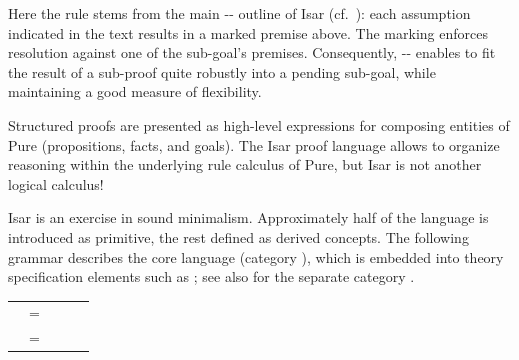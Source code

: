 \begin{isabellebody}
\begin{isamarkuptext}
  \noindent Here the  rule stems from the
  main \hyperlink{command.fix}{\mbox{}}-\hyperlink{command.assume}{\mbox{}}-\hyperlink{command.show}{\mbox{}} outline of
  Isar (cf.\ ): each assumption
  indicated in the text results in a marked premise  above.
  The marking enforces resolution against one of the sub-goal's
  premises.  Consequently, \hyperlink{command.fix}{\mbox{}}-\hyperlink{command.assume}{\mbox{}}-\hyperlink{command.show}{\mbox{}} enables to fit the result of a sub-proof quite robustly into a
  pending sub-goal, while maintaining a good measure of flexibility.%
\end{isamarkuptext}%
\isamarkuptrue%
%
\isamarkuptrue%
%
\begin{isamarkuptext}%
Structured proofs are presented as high-level expressions for
  composing entities of Pure (propositions, facts, and goals).  The
  Isar proof language allows to organize reasoning within the
  underlying rule calculus of Pure, but Isar is not another logical
  calculus!

  Isar is an exercise in sound minimalism.  Approximately half of the
  language is introduced as primitive, the rest defined as derived
  concepts.  The following grammar describes the core language
  (category ), which is embedded into theory
  specification elements such as \hyperlink{command.theorem}{\mbox{}}; see also
   for the separate category .

  \medskip
  \begin{tabular}{rcl}
    \isa{{\isachardoublequote}theory{\isasymdash}stmt{\isachardoublequote}} & = & \hyperlink{command.theorem}{\mbox{\isa{\isacommand{theorem}}}}~\isa{{\isachardoublequote}statement\ proof\ \ {\isacharbar}{\isachardoublequote}}~~\hyperlink{command.definition}{\mbox{\isa{\isacommand{definition}}}}~\isa{{\isachardoublequote}{\isasymdots}\ \ {\isacharbar}\ \ {\isasymdots}{\isachardoublequote}} \\[1ex]

    \isa{{\isachardoublequote}proof{\isachardoublequote}} & = & \isa{{\isachardoublequote}prfx\isactrlsup {\isacharasterisk}{\isachardoublequote}}~\hyperlink{command.proof}{\mbox{\isa{\isacommand{proof}}}}~\isa{{\isachardoublequote}method\isactrlsup {\isacharquery}\ stmt\isactrlsup {\isacharasterisk}{\isachardoublequote}}~\hyperlink{command.qed}{\mbox{\isa{\isacommand{qed}}}}~\isa{{\isachardoublequote}method\isactrlsup {\isacharquery}{\isachardoublequote}} \\[1ex]


\end{tabular}
\end{isamarkuptext}
\end{isabellebody}
